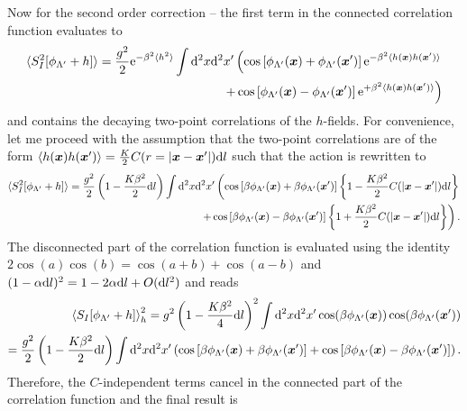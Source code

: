 Now for the second order correction -- the first term in the connected correlation function evaluates to
\begin{align}
    \braket{S^2_I[\phi_{\Lambda'}+h]}=\frac{g^2}2\mathrm e^{-\beta^2\braket{h^2}}\int\mathrm d^2x\mathrm d^2x'
    \left(
        \cos\left[ \phi_{\Lambda'}({\bm x})+\phi_{\Lambda'}({\bm x'}) \right]\mathrm e^{-\beta^2\braket{h({\bm x})h({\bm x'})}}
        \right.\\
        \left.+
        \cos\left[ \phi_{\Lambda'}({\bm x})-\phi_{\Lambda'}({\bm x'}) \right]\mathrm e^{+\beta^2\braket{h({\bm x})h({\bm x'})}}
    \right)
    \label{eq:second_order_rg_term1}
\end{align}
and contains the decaying two-point correlations of the $h$-fields.
For convenience, let me proceed with the assumption that the two-point correlations are of the form $\braket{h({\bm x})h({\bm x'})} = \frac K2 C(r=|{\bm x}-{\bm x'}|)\mathrm d l$ such that the action is rewritten to
{\small
\begin{align}
    \braket{S^2_I[\phi_{\Lambda'}+h]}=\frac{g^2}2\left( 1 - \frac{K\beta^2}2\mathrm d l \right)\int\mathrm d^2x\mathrm d^2x'
    \left(
        \cos\left[ \beta\phi_{\Lambda'}({\bm x})+\beta\phi_{\Lambda'}({\bm x'}) \right]\left\{ 1-\frac{K\beta^2}2C(|{\bm x}-{\bm x'}|)\mathrm d l \right\}
        \right.\\
        \left.+
        \cos\left[ \beta\phi_{\Lambda'}({\bm x})-\beta\phi_{\Lambda'}({\bm x'}) \right]\left\{ 1+\frac{K\beta^2}2C(|{\bm x}-{\bm x'}|)\mathrm d l \right\}
    \right).
\end{align}
}%
The disconnected part of the correlation function is evaluated using the identity $2\cos(a)\cos(b)=\cos(a+b)+\cos(a-b)$ and $(1-\alpha\mathrm d l)^2 = 1-2\alpha\mathrm d l + O(\mathrm d l^2)$ and reads
\begin{align}
    \braket{S_I[\phi_{\Lambda'}+h]}_h^2
    = g^2\left( 1 - \frac{K\beta^2}4\mathrm d l \right)^2\int\mathrm d^2x\mathrm d^2x'\cos(\beta \phi_{\Lambda'}({\bm x}))\cos(\beta \phi_{\Lambda'}({\bm x'}))
    \\
    = \frac{g^2}2\left( 1 - \frac{K\beta^2}2\mathrm d l \right)\int\mathrm d^2x\mathrm d^2x'
        \left(
            \cos\left[ \beta \phi_{\Lambda'}({\bm x})+\beta \phi_{\Lambda'}({\bm x'}) \right]
            +
            \cos\left[ \beta \phi_{\Lambda'}({\bm x})-\beta \phi_{\Lambda'}({\bm x'}) \right]
        \right).
\end{align}
Therefore, the $C$-independent terms cancel in the connected part of the correlation function and the final result is
